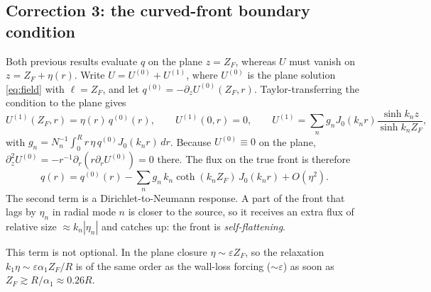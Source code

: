 \documentclass[11pt]{article}
\numberwithin{equation}{section}
\begin{document}
\subsection{Correction 3: the curved-front boundary condition}
Both previous results evaluate $q$ on the plane $z=Z_F$, whereas $U$ must vanish on $z=Z_F+\eta(r)$. Write $U=U^{(0)}+U^{(1)}$, where $U^{(0)}$ is the plane solution \eqref{eq:field} with $\ell=Z_F$, and let $q^{(0)}=-\partial_zU^{(0)}(Z_F,r)$. Taylor-transferring the condition to the plane gives
\begin{equation}U^{(1)}(Z_F,r)=\eta(r)\,q^{(0)}(r),\qquad U^{(1)}(0,r)=0,\qquad
U^{(1)}=\sum_ng_nJ_0(k_nr)\frac{\sinh k_nz}{\sinh k_nZ_F},\end{equation}
with $g_n=N_n^{-1}\int_0^Rr\,\eta\,q^{(0)}J_0(k_nr)\,dr$. Because $U^{(0)}\equiv0$ on the plane, $\partial_z^2U^{(0)}=-r^{-1}\partial_r(r\partial_rU^{(0)})=0$ there. The flux on the true front is therefore
\begin{equation}\boxed{q(r)=q^{(0)}(r)-\sum_ng_n\,k_n\coth(k_nZ_F)\,J_0(k_nr)+O(\eta^2).}\label{eq:DtN}\end{equation}
The second term is a Dirichlet-to-Neumann response. A part of the front that lags by $\eta_n$ in radial mode $n$ is closer to the source, so it receives an extra flux of relative size $\approx k_n|\eta_n|$ and catches up: the front is \emph{self-flattening}.

This term is not optional. In the plane closure $\eta\sim\varepsilon Z_F$, so the relaxation $k_1\eta\sim\varepsilon\alpha_1Z_F/R$ is of the same order as the wall-loss forcing ($\sim\varepsilon$) as soon as $Z_F\gtrsim R/\alpha_1\approx0.26R$.
\end{document}
